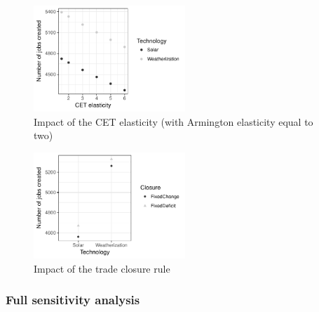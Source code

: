 \begin{figure}[!h]
	\centering
	\includegraphics[height=4cm]{figures/CET.pdf}
	\caption{Impact of the CET elasticity (with Armington elasticity equal to two)}
	\label{fig:cet}
\end{figure}

\begin{figure}[!h]
	\centering
	\includegraphics[height=4cm]{figures/closure.pdf}
	\caption{Impact of the trade closure rule}
	\label{fig:closure}
\end{figure}

\subsubsection{Full sensitivity analysis}
\label{sec:full_sensitivity}


